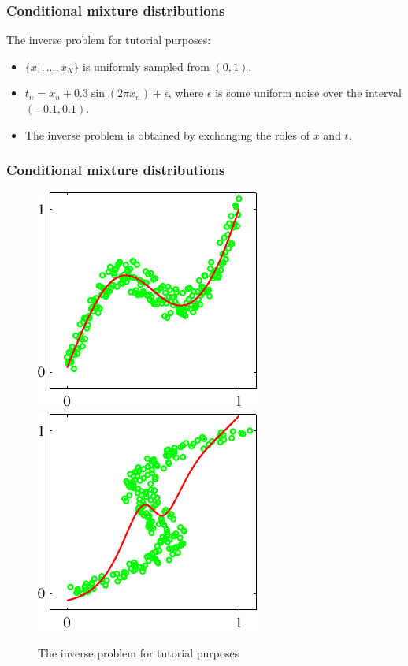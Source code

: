 \documentclass{beamer}
\begin{document}
\begin{frame}
    \frametitle{Conditional mixture distributions}
    The inverse problem for tutorial purposes:
    \begin{itemize}
        \item $\{x_{1},\hdots,x_{N}\}$ is uniformly sampled from $(0,1)$.
        \item $t_{n}=x_{n}+0.3\sin(2\pi{}x_{n})+\epsilon$, where $\epsilon$ is some uniform noise over the interval $(-0.1,0.1)$.
        \item The inverse problem is obtained by exchanging the roles of $x$ and $t$.
    \end{itemize}
\end{frame}

\begin{frame}
    \frametitle{Conditional mixture distributions}
    \begin{figure}
        \caption{The inverse problem for tutorial purposes}
        \includegraphics{Figure_17_a.pdf}
        \includegraphics{Figure_17_b.pdf}
    \end{figure}
\end{frame}
\end{document}
